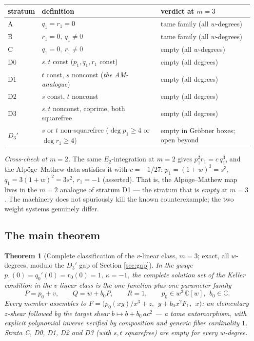 \documentclass[11pt]{article}
\newtheorem{theorem}{Theorem}[section]
\theoremstyle{definition}
\theoremstyle{remark}
\newcommand{\C}{\mathbb{C}}
\begin{document}
\begin{center}
\small
\begin{tabular}{lll}
\hline
stratum & definition & verdict at $m=3$ \\
\hline
A & $q_1 = r_1 = 0$ & tame family (all $w$-degrees) \\
B & $r_1 = 0,\ q_1 \ne 0$ & tame family (all $w$-degrees) \\
C & $q_1 = 0,\ r_1 \ne 0$ & empty (all $w$-degrees) \\
D0 & $s,t$ const ($p_1,q_1,r_1$ const) & empty (all degrees) \\
D1 & $t$ const, $s$ nonconst (\emph{the AM-analogue}) &
 empty (all degrees) \\
D2 & $s$ const, $t$ nonconst & empty (all degrees) \\
D3 & $s,t$ nonconst, coprime, both squarefree & empty (all degrees) \\
$D_3'$ & $s$ or $t$ non-squarefree ($\deg p_1 \ge 4$ or $\deg r_1\ge4$) &
 empty in Gr\"obner boxes; open beyond \\
\hline
\end{tabular}
\end{center}

\emph{Cross-check at $m=2$.} The same $E_2$-integration at $m=2$ gives
$p_1^2r_1 = c\,q_1^3$, and the Alp\"oge--Mathew data satisfies it with
$c = -1/27$: $p_1 = (1+w)^3 = s^3$, $q_1 = 3(1+w)^2 = 3s^2$, $r_1 = -1$
(asserted). That is, the Alp\"oge--Mathew map lives in the $m=2$
analogue of stratum D1 --- the stratum that is \emph{empty} at $m=3$.
The machinery does not spuriously kill the known counterexample; the two
weight systems genuinely differ.

\subsection{The main theorem}

\begin{theorem}[Complete classification of the $v$-linear class,
$m=3$; exact, all $w$-degrees, modulo the $D_3'$ gap of Section
\ref{sec:gap}]\label{thm:113main}
In the gauge $p_1(0) = q_0'(0) = r_0(0) = 1$, $\kappa = -1$, the
complete solution set of the Keller condition in the $v$-linear class
is the one-function-plus-one-parameter family
\[
\boxed{\ P = p_0 + v,\qquad Q = w + b_0P,\qquad R = 1,\qquad
p_0 \in w^3\,\C[w],\ \ b_0 \in \C .\ }
\]
Every member assembles to
$F = \bigl(p_0(xy)/x^3 + z,\ \ y + b_0x^2F_1,\ \ x\bigr)$: an
elementary $z$-shear followed by the target shear
$b \mapsto b + b_0\,ac^2$ --- a \emph{tame automorphism}, with explicit
polynomial inverse verified by composition and generic fiber
cardinality $1$. Strata C, D0, D1, D2 and D3 (with $s,t$ squarefree)
are empty for every $w$-degree.
\end{theorem}
\end{document}
